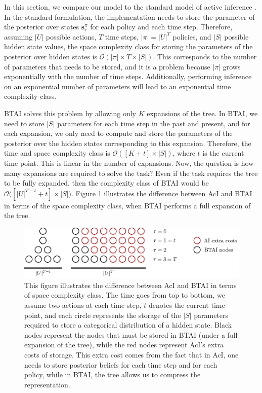 \documentclass[twoside,11pt]{article}
\begin{document}
In this section, we compare our model to the standard model of active inference \citep{FRISTON2016862,AI_TUTO}. In the standard formulation, the implementation needs to store the parameter of the posterior over states $\bm{s}^\pi_\tau$ for each policy and each time step. Therefore, assuming $|U|$ possible actions, $T$ time steps, $|\pi| = |U|^T$ policies, and $|S|$ possible hidden state values, the space complexity class for storing the parameters of the posterior over hidden states is $\mathcal{O}(|\pi| \times T \times |S|)$. This corresponds to the number of parameters that needs to be stored, and it is a problem because $|\pi|$ grows exponentially with the number of time steps. Additionally, performing inference on an exponential number of parameters will lead to an exponential time complexity class.

BTAI solves this problem by allowing only $K$ expansions of the tree. In BTAI, we need to store $|S|$ parameters for each time step in the past and present, and for each expansion, we only need to compute and store the parameters of the posterior over the hidden states corresponding to this expansion. Therefore, the time and space complexity class is $\mathcal{O}([K + t] \times |S|)$, where $t$ is the current time point. This is linear in the number of expansions. Now, the question is how many expansions are required to solve the task? Even if the task requires the tree to be fully expanded, then the complexity class of BTAI would be $\mathcal{O}\big([|U|^{T - t} + t] \times |S|\big)$. Figure \ref{fig:complexity_class_theory} illustrates the difference between AcI and BTAI in terms of the space complexity class, when BTAI performs a full expansion of the tree.

\begin{figure}[H]
	\begin{center}
	\includegraphics[scale=1]{BTAI_Empirical_Article-figure2}
	\end{center}
\vspace{-0.25cm}
    \caption{
This figure illustrates the difference between AcI and BTAI in terms of space complexity class. The time goes from top to bottom, we assume two actions at each time step, $t$ denotes the current time point, and each circle represents the storage of the $|S|$ parameters required to store a categorical distribution of a hidden state. Black nodes represent the nodes that must be stored in BTAI (under a full expansion of the tree), while the red nodes represent AcI's extra costs of storage. This extra cost comes from the fact that in AcI, one needs to store posterior beliefs for each time step and for each policy, while in BTAI, the tree allows us to compress the representation.}
    \label{fig:complexity_class_theory}
\end{figure}
\end{document}

